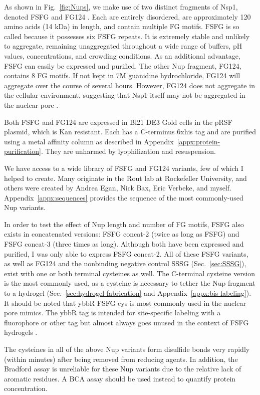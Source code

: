 As shown in Fig.~\ref{fig:Nups}, we make use of two distinct fragments of Nsp1, denoted FSFG and FG124 \cite{hough15}.  Each are entirely disordered, are approximately 120 amino acids (14 kDa) in length, and contain multiple FG motifs.  FSFG is so called because it possesses six FSFG repeats.  It is extremely stable and unlikely to aggregate, remaining unaggregated throughout a wide range of buffers, pH values, concentrations, and crowding conditions.  As an additional advantage, FSFG can easily be expressed and purified.  The other Nup fragment, FG124, contains 8 FG motifs.  If not kept in 7M guanidine hydrochloride, FG124 will aggregate over the course of several hours.  However, FG124 does not aggregate in the cellular environment, suggesting that Nsp1 itself may not be aggregated in the nuclear pore \cite{hough15}. 

Both FSFG and FG124 are expressed in Bl21 DE3 Gold cells in the pRSF plasmid, which is Kan resistant.  Each has a C-terminus 6xhis tag and are purified using a metal affinity column as described in Appendix~\ref{appx:protein-purification}.  They are unharmed by lyophilization and resuspension.

We have access to a wide library of FSFG and FG124 variants, few of which I helped to create. Many originate in the Rout lab at Rockefeller University, and others were created by Andrea Egan, Nick Bax, Eric Verbeke, and myself. Appendix~\ref{appx:sequences} provides the sequence of the most commonly-used Nup variants.

In order to test the effect of Nup length and number of FG motifs, FSFG also exists in concatenated versions: FSFG concat-2 (twice as long as FSFG) and FSFG concat-3 (three times as long).  Although both have been expressed and purified, I was only able to express FSFG concat-2.  All of these FSFG variants, as well as FG124 and the nonbinding negative control SSSG (Sec.~\ref{sec:SSSG}), exist with one or both terminal cysteines as well.  The C-terminal cysteine version is the most commonly used, as a cysteine is necessary to tether the Nup fragment to a hydrogel (Sec.~\ref{sec:hydrogel-fabrication} and Appendix~\ref{appx:bis-labeling}).  It should be noted that ybbR FSFG cys is most commonly used in the nuclear pore mimics.  The ybbR tag is intended for site-specific labeling with a fluorophore or other tag but almost always goes unused in the context of FSFG hydrogels \cite{yin05}.

The cysteines in all of the above Nup variants form disulfide bonds very rapidly (within minutes) after being removed from reducing agents.  In addition, the Bradford assay is unreliable for these Nup variants due to the relative lack of aromatic residues.  A BCA assay should be used instead to quantify protein concentration.


